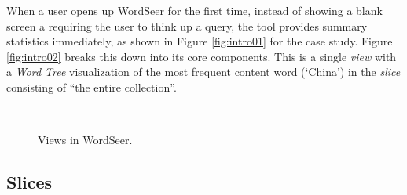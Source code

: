 \documentclass{sig-alternate}
\begin{document}
When a user opens up WordSeer for the first time, instead of  showing a blank screen a requiring the user to think up a query, the tool  provides summary statistics immediately, as shown in Figure \ref{fig:intro01} for the case study.  Figure \ref{fig:intro02} breaks this down into its core components. This is a single \emph{view} with a \emph{Word Tree} visualization of the most frequent content word (`China') in the \emph{slice} consisting of ``the entire collection''. 

\begin{figure}[ht!]
\begin{center}
%
        \\
%
    \end{center}
    \caption{%
       Views in WordSeer.
     }%
\end{figure}

\subsection{Slices}
\end{document}
